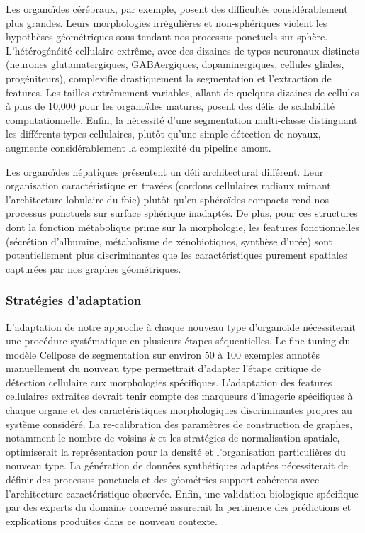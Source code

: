 Les organoïdes cérébraux, par exemple, posent des difficultés considérablement plus grandes. Leurs morphologies irrégulières et non-sphériques violent les hypothèses géométriques sous-tendant nos processus ponctuels sur sphère. L'hétérogénéité cellulaire extrême, avec des dizaines de types neuronaux distincts (neurones glutamatergiques, GABAergiques, dopaminergiques, cellules gliales, progéniteurs), complexifie drastiquement la segmentation et l'extraction de features. Les tailles extrêmement variables, allant de quelques dizaines de cellules à plus de 10,000 pour les organoïdes matures, posent des défis de scalabilité computationnelle. Enfin, la nécessité d'une segmentation multi-classe distinguant les différents types cellulaires, plutôt qu'une simple détection de noyaux, augmente considérablement la complexité du pipeline amont.

Les organoïdes hépatiques présentent un défi architectural différent. Leur organisation caractéristique en travées (cordons cellulaires radiaux mimant l'architecture lobulaire du foie) plutôt qu'en sphéroïdes compacts rend nos processus ponctuels sur surface sphérique inadaptés. De plus, pour ces structures dont la fonction métabolique prime sur la morphologie, les features fonctionnelles (sécrétion d'albumine, métabolisme de xénobiotiques, synthèse d'urée) sont potentiellement plus discriminantes que les caractéristiques purement spatiales capturées par nos graphes géométriques.

\subsubsection{Stratégies d'adaptation}

L'adaptation de notre approche à chaque nouveau type d'organoïde nécessiterait une procédure systématique en plusieurs étapes séquentielles. Le fine-tuning du modèle Cellpose de segmentation sur environ 50 à 100 exemples annotés manuellement du nouveau type permettrait d'adapter l'étape critique de détection cellulaire aux morphologies spécifiques. L'adaptation des features cellulaires extraites devrait tenir compte des marqueurs d'imagerie spécifiques à chaque organe et des caractéristiques morphologiques discriminantes propres au système considéré. La re-calibration des paramètres de construction de graphes, notamment le nombre de voisins $k$ et les stratégies de normalisation spatiale, optimiserait la représentation pour la densité et l'organisation particulières du nouveau type. La génération de données synthétiques adaptées nécessiterait de définir des processus ponctuels et des géométries support cohérents avec l'architecture caractéristique observée. Enfin, une validation biologique spécifique par des experts du domaine concerné assurerait la pertinence des prédictions et explications produites dans ce nouveau contexte.

